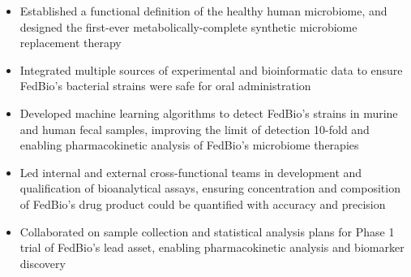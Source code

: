 \documentclass[letterpaper,10pt]{article}
\begin{document}
\begin{itemize}
\begin{itemize}
			\item Established a functional definition of the healthy human microbiome, and designed the first-ever metabolically-complete synthetic microbiome replacement therapy
			\item Integrated multiple sources of experimental and bioinformatic data to ensure FedBio's bacterial strains were safe for oral administration
			\item Developed machine learning algorithms to detect FedBio's strains in murine and human fecal samples, improving the limit of detection 10-fold and enabling pharmacokinetic analysis of FedBio's microbiome therapies
			\item Led internal and external cross-functional teams in development and qualification of bioanalytical assays, ensuring concentration and composition of FedBio's drug product could be quantified with accuracy and precision
			\item Collaborated on sample collection and statistical analysis plans for Phase 1 trial of FedBio's lead asset, enabling pharmacokinetic analysis and biomarker discovery
			


\end{itemize}
\end{itemize}
\end{document}
